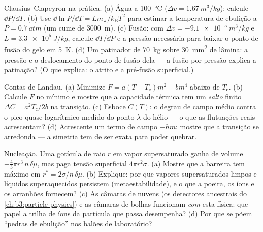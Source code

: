 \begin{exercise}[$\star\star$]\label{exo:b3:phase-transitions:7}
Clausius--Clapeyron na prática. (a) Água a \qty{100}{\celsius}
($\Delta v = \qty{1.67}{m^3/kg}$): calcule $\dd P/\dd T$. (b)
Use $\dd\ln P/\dd T = Lm_{\text{w}}/k_{\text{B}}T^2$ para estimar
a temperatura de ebulição a $P = \qty{0.7}{atm}$ (um cume de
\qty{3000}{m}). (c) Fusão: com $\Delta v = \qty{-9.1e-5}{m^3/kg}$ e
$L = \qty{3.3e5}{J/kg}$, calcule $\dd T/\dd P$ e a pressão
necessária para baixar o ponto de fusão do gelo em \qty{5}{K}. (d) Um
patinador de \qty{70}{kg} sobre \qty{30}{mm^2} de lâmina: a pressão e
o deslocamento do ponto de fusão dela --- a fusão por pressão explica a
patinação? (O que explica: o atrito e a pré-fusão superficial.)
\end{exercise}

\begin{exercise}[$\star\star$]\label{exo:b3:phase-transitions:8}
Contas de Landau. (a) Minimize $F = a(T - T_{\text{c}})m^2 +
bm^4$ abaixo de $T_{\text{c}}$. (b) Calcule $F$ no mínimo e
mostre que a capacidade térmica tem um \emph{salto} finito $\Delta C =
a^2T_{\text{c}}/2b$ na transição. (c) Esboce $C(T)$:
o degrau de campo médio contra o pico quase logarítmico medido do
ponto $\lambda$ do hélio --- o que as flutuações reais acrescentam? (d)
Acrescente um termo de campo $-hm$: mostre que a transição se arredonda
--- a simetria tem de ser exata para poder quebrar.
\end{exercise}

\begin{exercise}[$\star\star$]\label{exo:b3:phase-transitions:9}
Nucleação. Uma gotícula de raio $r$ em vapor supersaturado
ganha  de volume $-\tfrac43\pi r^3\,n\,\delta\mu$, mas paga
tensão superficial $4\pi r^2\sigma$. (a) Mostre que a barreira tem
máximo em $r^* = 2\sigma/n\,\delta\mu$. (b) Explique: por que vapores
supersaturados limpos e líquidos superaquecidos persistem
(metaestabilidade), e o que a poeira, os íons e os arranhões fornecem?
(c) As câmaras de nuvens (os detectores ancestrais do
\cref{ch:b3:particle-physics}) e as câmaras de bolhas funcionam
\emph{com} esta física: que papel a trilha de íons da partícula que
passa desempenha? (d) Por que se põem ``pedras de ebulição'' nos balões
de laboratório?
\end{exercise}

